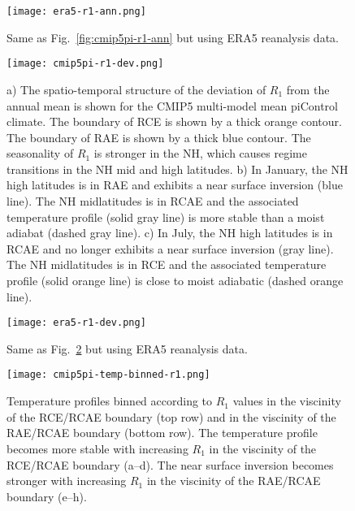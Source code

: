 \documentclass{ametsocV5}
\begin{document}
\begin{figure}[t]
  \noindent\texttt{[image: era5-r1-ann.png]}\\
  \caption{Same as Fig.~\ref{fig:cmip5pi-r1-ann} but using ERA5 reanalysis data.}
  \label{fig:era5-r1-ann}
\end{figure}

\begin{figure}[t]
  \noindent\texttt{[image: cmip5pi-r1-dev.png]}\\
  \caption{a) The spatio-temporal structure of the deviation of \(R_{1}\) from the annual mean is shown for the CMIP5 multi-model mean piControl climate. The boundary of RCE is shown by a thick orange contour. The boundary of RAE is shown by a thick blue contour. The seasonality of \(R_{1}\) is stronger in the NH, which causes regime transitions in the NH mid and high latitudes. b) In January, the NH high latitudes is in RAE and exhibits a near surface inversion (blue line). The NH midlatitudes is in RCAE and the associated temperature profile (solid gray line) is more stable than a moist adiabat (dashed gray line). c) In July, the NH high latitudes is in RCAE and no longer exhibits a near surface inversion (gray line). The NH midlatitudes is in RCE and the associated temperature profile (solid orange line) is close to moist adiabatic (dashed orange line).}
  \label{fig:cmip5pi-r1-dev}
\end{figure}

\begin{figure}[t]
  \noindent\texttt{[image: era5-r1-dev.png]}\\
  \caption{Same as Fig.~\ref{fig:cmip5pi-r1-dev} but using ERA5 reanalysis data.}
  \label{fig:era5-r1-dev}
\end{figure}

\begin{figure}
  \noindent\texttt{[image: cmip5pi-temp-binned-r1.png]}\\
  \caption{Temperature profiles binned according to $R_{1}$ values in the viscinity of the RCE/RCAE boundary (top row) and in the viscinity of the RAE/RCAE boundary (bottom row). The temperature profile becomes more stable with increasing $R_{1}$ in the viscinity of the RCE/RCAE boundary (a--d). The near surface inversion becomes stronger with increasing $R_{1}$ in the viscinity of the RAE/RCAE boundary (e--h).}
  \label{fig:cmip5pi-temp-binned-r1}
\end{figure}
\end{document}
